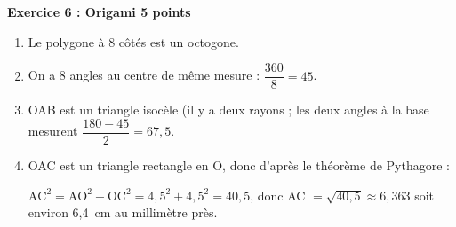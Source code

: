 \textbf{Exercice 6 : Origami \hfill 5 points}

\medskip  

%
%
\begin{enumerate}
\item Le polygone à 8 côtés est un octogone.
\item On a 8 angles au centre de même mesure : $\dfrac{360}{8} = 45$\degres.
\item OAB est un triangle isocèle (il y a deux rayons  ; les deux angles à la base mesurent $\dfrac{180 - 45}{2} = 67,5$\degres.
\item OAC est un triangle rectangle en O, donc d'après le théorème de Pythagore :

$\text{AC}^2 = \text{AO}^2 + \text{OC}^2 = 4,5^2 + 4,5^2 = 40,5$, donc AC $ = \sqrt{40,5} \approx 6,363$ soit environ 6,4~cm au millimètre près.
\end{enumerate}

\vspace{0,5cm}

